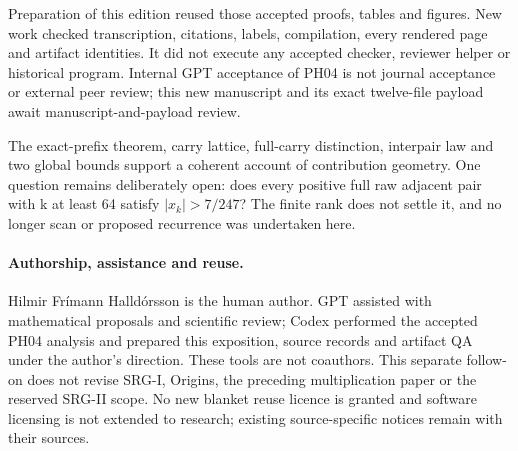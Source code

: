 \documentclass[11pt,a4paper]{article}
\begin{document}
Preparation of this edition reused those accepted proofs, tables and figures. New work checked transcription, citations, labels, compilation, every rendered page and artifact identities. It did not execute any accepted checker, reviewer helper or historical program. Internal GPT acceptance of PH04 is not journal acceptance or external peer review; this new manuscript and its exact twelve-file payload await manuscript-and-payload review.

The exact-prefix theorem, carry lattice, full-carry distinction, interpair law and two global bounds support a coherent account of contribution geometry. One question remains deliberately open: does every positive full raw adjacent pair with k at least 64 satisfy $|x_k|>7/247$? The finite rank does not settle it, and no longer scan or proposed recurrence was undertaken here.

\paragraph{Authorship, assistance and reuse.}
Hilmir Frímann Halldórsson is the human author. GPT assisted with mathematical proposals and scientific review; Codex performed the accepted PH04 analysis and prepared this exposition, source records and artifact QA under the author's direction. These tools are not coauthors. This separate follow-on does not revise SRG-I, Origins, the preceding multiplication paper or the reserved SRG-II scope. No new blanket reuse licence is granted and software licensing is not extended to research; existing source-specific notices remain with their sources.
\end{document}
